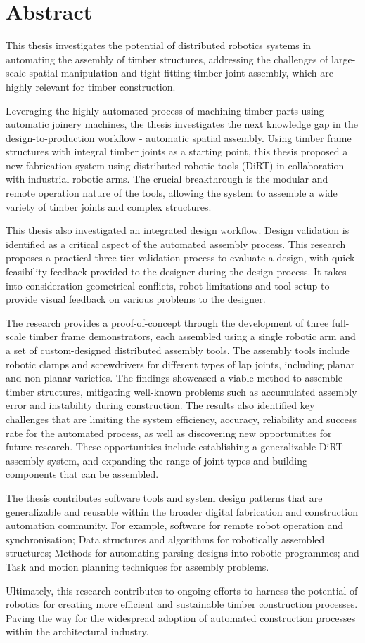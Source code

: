 \chapter*{Abstract}

This thesis investigates the potential of distributed robotics systems in automating the assembly of timber structures, addressing the challenges of large-scale spatial manipulation and tight-fitting timber joint assembly, which are highly relevant for timber construction.

Leveraging the highly automated process of machining timber parts using automatic joinery machines, the thesis investigates the next knowledge gap in the design-to-production workflow - automatic spatial assembly. Using timber frame structures with integral timber joints as a starting point, this thesis proposed a new fabrication system using distributed robotic tools (DiRT) in collaboration with industrial robotic arms. The crucial breakthrough is the modular and remote operation nature of the tools, allowing the system to assemble a wide variety of timber joints and complex structures.

This thesis also investigated an integrated design workflow. Design validation is identified as a critical aspect of the automated assembly process. This research proposes a practical three-tier validation process to evaluate a design, with quick feasibility feedback provided to the designer during the design process. It takes into consideration geometrical conflicts, robot limitations and tool setup to provide visual feedback on various problems to the designer. 

The research provides a proof-of-concept through the development of three full-scale timber frame demonstrators, each assembled using a single robotic arm and a set of custom-designed distributed assembly tools. The assembly tools include robotic clamps and screwdrivers for different types of lap joints, including planar and non-planar varieties. The findings showcased a viable method to assemble timber structures, mitigating well-known problems such as accumulated assembly error and instability during construction. The results also identified key challenges that are limiting the system efficiency, accuracy, reliability and success rate for the automated process, as well as discovering new opportunities for future research. These opportunities include establishing a generalizable DiRT assembly system, and expanding the range of joint types and building components that can be assembled.

The thesis contributes software tools and system design patterns that are generalizable and reusable within the broader digital fabrication and construction automation community. For example, software for remote robot operation and synchronisation; Data structures and algorithms for robotically assembled structures; Methods for automating parsing designs into robotic programmes; and Task and motion planning techniques for assembly problems.

Ultimately, this research contributes to ongoing efforts to harness the potential of robotics for creating more efficient and sustainable timber construction processes. Paving the way for the widespread adoption of automated construction processes within the architectural industry.
